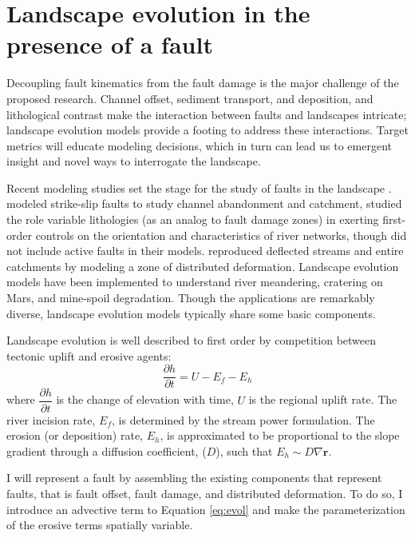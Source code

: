 \documentclass[12pt, notitlepage]{report}
\begin{document}
\section{Landscape evolution in the presence of a fault}
Decoupling fault kinematics from the fault damage is the major challenge of the proposed research. Channel offset, sediment transport, and deposition, and lithological contrast make the interaction between faults and landscapes intricate; landscape evolution models provide a footing to address these interactions. Target metrics will educate modeling decisions, which in turn can lead us to emergent insight and novel ways to interrogate the landscape.

Recent modeling studies set the stage for the study of faults in the landscape \cite{DuvallDynamicEnvironment, Roy2016, Gray2018Off-faultDrainages, Harbert2018TheLandscape}. \textcite{DuvallDynamicEnvironment} modeled strike-slip faults to study channel abandonment and catchment, \textcite{Roy2016} studied the role variable lithologies  (as an analog to fault damage zones) in exerting first-order controls on the orientation and characteristics of river networks, though did not include active faults in their models. \textcite{Gray2018Off-faultDrainages} reproduced deflected streams and entire catchments by modeling a zone of distributed deformation. Landscape evolution models have been implemented to understand river meandering, cratering on Mars, and mine-spoil degradation. Though the applications are remarkably diverse, landscape evolution models typically share some basic components.
 
Landscape evolution is well described to first order by competition between tectonic uplift and erosive agents:
\begin{equation}\label{eq:evol}
    \dfrac{\partial{h}}{\partial{t}} = U - E_f - E_h
\end{equation}
where $\dfrac{\partial{h}}{\partial{t}}$ is the change of elevation with time, $U$ is the regional uplift rate. The river incision rate, $E_f$, is determined by the stream power formulation. The erosion (or deposition) rate, $E_h$, is approximated to be proportional to the slope gradient through a diffusion coefficient, ($D$), such that $E_h \sim D\nabla \boldsymbol{r}.$

I will represent a fault by assembling the existing components that represent faults, that is fault offset, fault damage, and distributed deformation. To do so, I introduce an advective term to Equation \ref{eq:evol} and make the parameterization of the erosive terms spatially variable. 
\end{document}
